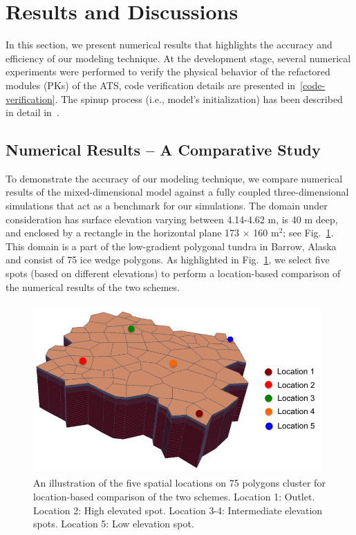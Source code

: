 \documentclass[review,11pt]{elsarticle}
\begin{document}
\section{Results and Discussions}\label{numerical-tests}

In this section, we present numerical results that highlights the accuracy and efficiency of our modeling technique. At the development stage, several numerical experiments were performed to verify the physical behavior of the refactored modules (PKs) of the ATS, code verification details are presented in~\ref{code-verification}. The spinup process (i.e., model's initialization) has been described in detail in~\cite{spainter2016integrated}. 


\subsection {Numerical Results -- A Comparative Study} 
To demonstrate the accuracy of our modeling technique, we compare numerical results of the mixed-dimensional model against a fully coupled three-dimensional simulations that act as a benchmark for our simulations. The domain under consideration has surface elevation varying between 4.14-4.62 m, is 40 m deep, and enclosed by a rectangle in the horizontal plane 173 $\times$ 160 m$^2$; see Fig.~\ref{surf-location}. This domain is a part of the low-gradient polygonal tundra in Barrow, Alaska and consist of 75 ice wedge polygons. As highlighted in Fig.~\ref{surf-location}, we select five spots (based on different elevations) to perform a location-based comparison of the numerical results of the two schemes. 
\begin{figure}[!htpb]
\centering
\includegraphics[height = 6.5cm, width=11cm]{figures/lobster75-3d.png}
\caption{An illustration of the five spatial locations on 75 polygons cluster for location-based comparison of the two schemes. Location 1: Outlet. Location 2: High elevated spot. Location 3-4: Intermediate elevation spots. Location 5: Low elevation spot.}
\label{surf-location}
\end{figure}
\end{document}
